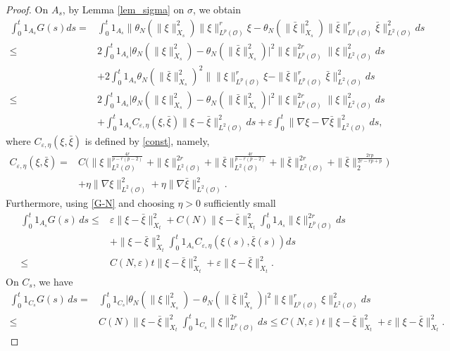 \documentclass[reqno, 11pt]{amsart}
\theoremstyle{definition}
\numberwithin{equation}{section} \numberwithin{lem}{section}
\numberwithin{thm}{section} \numberwithin{prop}{section}
\numberwithin{cor}{section} \numberwithin{rem}{section}
\numberwithin{defn}{section}
\begin{document}
\begin{proof}
On $A_s$, by Lemma \ref{lem_sigma} on $\sigma$, we  obtain 
\begin{align*}
\int_0^t1_{A_s}G(s)ds=&\int_0^t1_{A_s}\big\|\theta_N(\|\xi\|_{X_s}^2)\|\xi\|_{L^p(\mathcal O)}^r \xi-\theta_N(\|\bar \xi\|_{X_s}^2)\|\bar \xi \|_{L^p(\mathcal O)}^r \bar \xi\big\|_{L^2(\mathcal O)}^2ds
\\
\le &2\int_0^t1_{A_s}\big|\theta_N(\|\xi\|_{X_s}^2)-\theta_N(\|\bar \xi\|_{X_s}^2)\big|^2\|\xi\|_{L^p(\mathcal O)}^{2r}\|\xi\|_{L^2(\mathcal O)}^2ds\\&+2\int_0^t1_{A_s}\theta_N(\|\bar \xi\|_{X_s}^2)^2\big\|\|\xi\|_{L^p(\mathcal O)}^r \xi-\|\bar \xi \|_{L^p(\mathcal O)}^r \bar \xi\big\|_{L^2(\mathcal O)}^2ds\\
\le &2\int_0^t1_{A_s}\big|\theta_N(\|\xi\|_{X_s}^2)-\theta_N(\|\bar \xi\|_{X_s}^2)\big|^2\|\xi\|_{L^p(\mathcal O)}^{2r}\|\xi\|_{L^2(\mathcal O)}^2ds\\&+\int_0^t1_{A_s}C_{\varepsilon,\eta}(\xi,\bar\xi) \|\xi-\bar \xi\|_{L^2(\mathcal O)}^2ds+\varepsilon \int_0^t\|\nabla \xi-\nabla\bar \xi\|_{L^2(\mathcal O)}^2ds,
\end{align*}
where \(C_{\varepsilon,\eta}(\xi,\bar\xi)\) is defined by
\eqref{const}, namely,  \begin{align*}
   C_{\varepsilon,\eta}(\xi,\bar\xi)=&C\big(
\|\xi\|_{L^2(\mathcal O)}^{\frac{4r}{p-r(p-2)}}
+
\|\xi\|_{L^2(\mathcal O)}^{2r}+\|\bar \xi\|_{L^2(\mathcal O)}^{\frac{4r}{p-r(p-2)}}
+
\|\bar \xi\|_{L^2(\mathcal O)}^{2r}+\|\bar \xi\|_2^{\frac{2rp}{2r-rp+p}}\big)  \\&+\eta\|\nabla \xi\|_{L^2(\mathcal O)}^2+
\eta\|\nabla \bar \xi\|_{L^2(\mathcal O)}^2.
\end{align*} 
Furthermore, using \eqref{G-N} and choosing $\eta>0$ sufficiently small 
\begin{align*}
    \int_0^t1_{A_s}G(s)\,ds\le &\varepsilon\|\xi-\bar \xi\|_{X_t}^2
+C(N)
\|\xi-\bar \xi\|_{X_t}^2\int_0^t1_{A_s}\|\xi\|_{L^p(\mathcal{O})}^{2r}ds\\
&+\|\xi-\bar \xi\|_{X_t}^2\int_0^t1_{A_s}  C_{\varepsilon,\eta}(\xi(s),\bar\xi(s))ds\\
\le &C(N,\varepsilon)t\|\xi-\bar \xi\|_{X_t}^2+\varepsilon\|\xi-\bar \xi\|_{X_t}^2.
\end{align*}
On $C_s$, we have 
\begin{align*}
\int_0^t1_{C_s}G(s)\,ds=&\int_0^t1_{C_s}\big|\theta_N(\|\xi\|_{X_s}^2)-\theta_N(\|\bar \xi\|_{X_s}^2)\big|^2\big\|\xi\|_{L^p(\mathcal O)}^r \xi\big\|_{L^2(\mathcal O)}^2ds\\\le& C(N)\|\xi-\bar \xi\|_{X_t}^2\int_0^t1_{C_s}\|\xi\|_{L^p(\mathcal{O})}^{2r}ds\le C(N,\varepsilon)t\|\xi-\bar \xi\|_{X_t}^2+\varepsilon\|\xi-\bar \xi\|_{X_t}^2.

\end{align*}
\end{proof}
\end{document}
